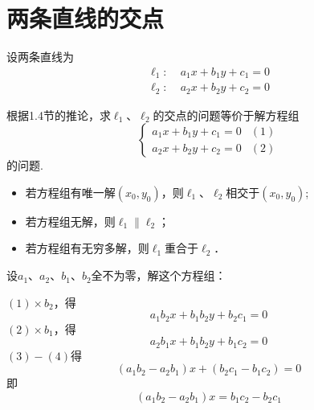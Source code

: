 \section{两条直线的交点}
设两条直线为
\[\begin{split}
 \ell_1:&\; a_1x+b_1y+c_1=0\\
\ell_2:&\; a_2x+b_2y+c_2=0   
\end{split}\]

根据1.4节的推论，求$\ell_1$、$\ell_2$的交点的问题等价于解方程组
\[\begin{cases}
    a_1x+b_1y+c_1=0 &(1)\\
    a_2x+b_2y+c_2=0 &(2)
\end{cases}\]
的问题.

\begin{itemize}
    \item 若方程组有唯一解$(x_0,y_0)$，则$\ell_1$、$\ell_2$相交于$(x_0,y_0)$;
    \item 若方程组无解，则$\ell_1\parallel \ell_2$；
    \item 若方程组有无穷多解，则$\ell_1$重合于$\ell_2$．
\end{itemize}

设$a_1$、$a_2$、$b_1$、$b_2$全不为零，解这个方程组：

$(1)\times b_2$，得
\begin{equation}
    a_1b_2x+b_1b_2y+b_2c_1=0 \tag{3}
\end{equation}
$(2)\times b_1$，得
\begin{equation}
    a_2b_1x+b_1b_2y+b_1c_2=0 \tag{4}
\end{equation}
$(3)-(4)$得
\[(a_1b_2-a_2b_1)x+(b_2c_1-b_1c_2)=0\]
即
\begin{equation}
    (a_1b_2-a_2b_1)x=b_1c_2-b_2c_1 \tag{5}
\end{equation}

